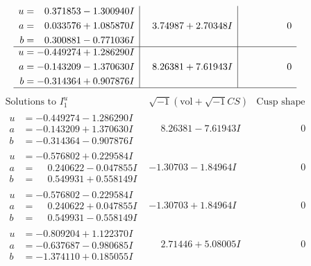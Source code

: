 \documentclass[1p]{elsarticle_modified}
\theoremstyle{definition}
\newcommand{\I}{\sqrt{-1}}
\begin{document}
$$\begin{array}{c|c|c}
\begin{aligned}
u &= \phantom{-}0.371853 - 1.300940 I \\
a &= \phantom{-}0.033576 + 1.085870 I \\
b &= \phantom{-}0.300881 - 0.771036 I\end{aligned}
 & \phantom{-}3.74987 + 2.70348 I & \phantom{-0.000000 } 0 \\ \hline\begin{aligned}
u &= -0.449274 + 1.286290 I \\
a &= -0.143209 - 1.370630 I \\
b &= -0.314364 + 0.907876 I\end{aligned}
 & \phantom{-}8.26381 + 7.61943 I & \phantom{-0.000000 } 0\\
 \hline 
 \end{array}$$\newpage$$\begin{array}{c|c|c}  
\text{Solutions to }I^u_{1}& \I (\text{vol} + \sqrt{-1}CS) & \text{Cusp shape}\\
 \hline 
\begin{aligned}
u &= -0.449274 - 1.286290 I \\
a &= -0.143209 + 1.370630 I \\
b &= -0.314364 - 0.907876 I\end{aligned}
 & \phantom{-}8.26381 - 7.61943 I & \phantom{-0.000000 } 0 \\ \hline\begin{aligned}
u &= -0.576802 + 0.229584 I \\
a &= \phantom{-}0.240622 - 0.047855 I \\
b &= \phantom{-}0.549931 + 0.558149 I\end{aligned}
 & -1.30703 - 1.84964 I & \phantom{-0.000000 } 0 \\ \hline\begin{aligned}
u &= -0.576802 - 0.229584 I \\
a &= \phantom{-}0.240622 + 0.047855 I \\
b &= \phantom{-}0.549931 - 0.558149 I\end{aligned}
 & -1.30703 + 1.84964 I & \phantom{-0.000000 } 0 \\ \hline\begin{aligned}
u &= -0.809204 + 1.122370 I \\
a &= -0.637687 - 0.980685 I \\
b &= -1.374110 + 0.185055 I\end{aligned}
 & \phantom{-}2.71446 + 5.08005 I & \phantom{-0.000000 } 0 \\ \hline\begin{aligned}

\end{aligned}
\end{array}$$
\end{document}
